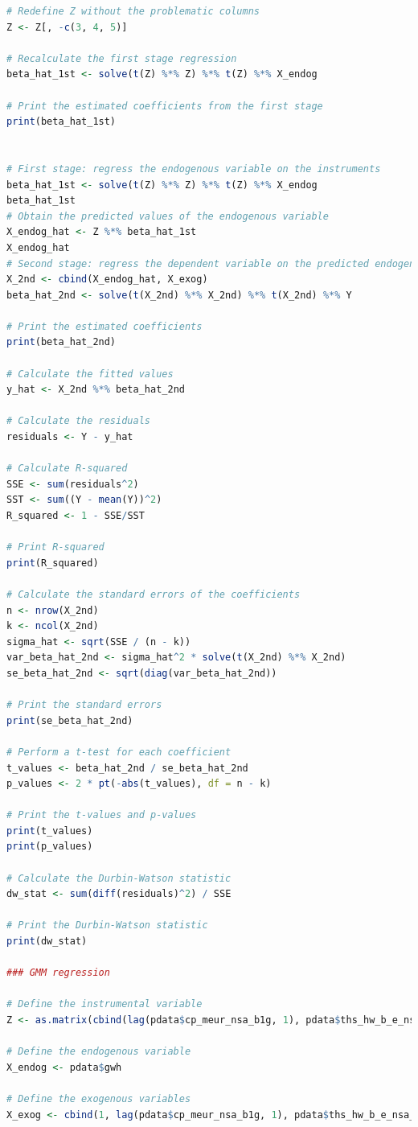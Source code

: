 \documentclass[12pt]{article}
\begin{document}
\begin{lstlisting}[language=R]
# Redefine Z without the problematic columns
Z <- Z[, -c(3, 4, 5)]

# Recalculate the first stage regression
beta_hat_1st <- solve(t(Z) %*% Z) %*% t(Z) %*% X_endog

# Print the estimated coefficients from the first stage
print(beta_hat_1st)


# First stage: regress the endogenous variable on the instruments
beta_hat_1st <- solve(t(Z) %*% Z) %*% t(Z) %*% X_endog
beta_hat_1st
# Obtain the predicted values of the endogenous variable
X_endog_hat <- Z %*% beta_hat_1st
X_endog_hat
# Second stage: regress the dependent variable on the predicted endogenous variable and the exogenous variables
X_2nd <- cbind(X_endog_hat, X_exog)
beta_hat_2nd <- solve(t(X_2nd) %*% X_2nd) %*% t(X_2nd) %*% Y

# Print the estimated coefficients
print(beta_hat_2nd)

# Calculate the fitted values
y_hat <- X_2nd %*% beta_hat_2nd

# Calculate the residuals
residuals <- Y - y_hat

# Calculate R-squared
SSE <- sum(residuals^2)
SST <- sum((Y - mean(Y))^2)
R_squared <- 1 - SSE/SST

# Print R-squared
print(R_squared)

# Calculate the standard errors of the coefficients
n <- nrow(X_2nd)
k <- ncol(X_2nd)
sigma_hat <- sqrt(SSE / (n - k))
var_beta_hat_2nd <- sigma_hat^2 * solve(t(X_2nd) %*% X_2nd)
se_beta_hat_2nd <- sqrt(diag(var_beta_hat_2nd))

# Print the standard errors
print(se_beta_hat_2nd)

# Perform a t-test for each coefficient
t_values <- beta_hat_2nd / se_beta_hat_2nd
p_values <- 2 * pt(-abs(t_values), df = n - k)

# Print the t-values and p-values
print(t_values)
print(p_values)

# Calculate the Durbin-Watson statistic
dw_stat <- sum(diff(residuals)^2) / SSE

# Print the Durbin-Watson statistic
print(dw_stat)

### GMM regression

# Define the instrumental variable
Z <- as.matrix(cbind(lag(pdata$cp_meur_nsa_b1g, 1), pdata$ths_hw_b_e_nsa_emp_dc - pdata$exp_e7000_gwh))

# Define the endogenous variable
X_endog <- pdata$gwh

# Define the exogenous variables
X_exog <- cbind(1, lag(pdata$cp_meur_nsa_b1g, 1), pdata$ths_hw_b_e_nsa_emp_dc - pdata$exp_e7000_gwh)


\end{lstlisting}
\end{document}
